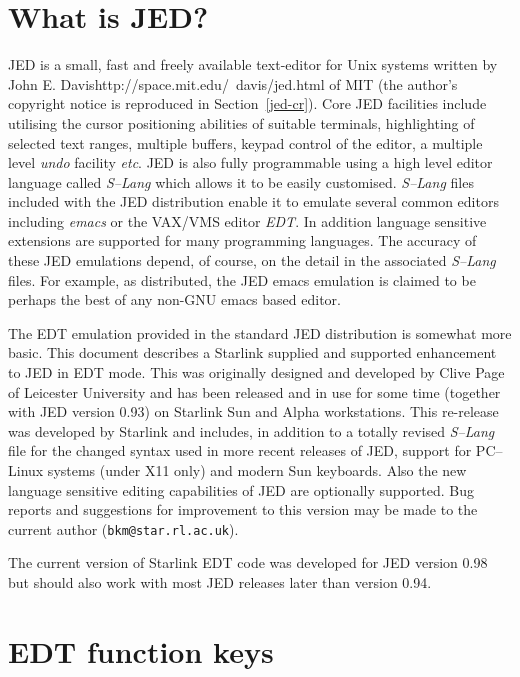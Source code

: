 \documentclass[twoside,11pt]{starlink}
\begin{document}
\scfrontmatter

\section{What is JED?}
\label{what_is_jed}

JED is a small, fast and freely available text-editor for Unix systems
written by \htmladdnormallink
{John E. Davis}{http://space.mit.edu/~davis/jed.html} of MIT (the author's
copyright notice is reproduced in Section~{\ref{jed-cr}}). Core JED
facilities include utilising the cursor positioning abilities of suitable
terminals, highlighting of selected text ranges, multiple buffers, keypad
control of the editor, a multiple level \textit{undo} facility
\textit{etc}. JED is also fully programmable using a high level editor
language called \textit{S--Lang} which allows it to be easily customised.
\textit{S--Lang} files included with the JED distribution enable it to
emulate several common editors including \textit{emacs} or the VAX/VMS
editor \textit{EDT}.  In addition language sensitive extensions are
supported for many programming languages. The accuracy of these JED
emulations depend, of course, on the detail in the associated
\textit{S--Lang} files. For example, as distributed, the JED emacs
emulation is claimed to be perhaps the best of any non-GNU emacs based
editor.

The EDT emulation provided in the standard JED distribution is
somewhat more basic. This document describes a Starlink supplied and
supported enhancement to JED in EDT mode. This was originally designed
and developed by Clive Page of Leicester University and has been
released and in use for some time (together with JED version 0.93) on
Starlink Sun and Alpha workstations. This re-release was developed by
Starlink and includes, in addition to a totally revised \textit{S--Lang}
file for the changed syntax used in more recent releases of
JED, support for PC--Linux systems (under X11 only) and modern Sun
keyboards. Also the new language sensitive editing capabilities
of JED are optionally supported. Bug reports and suggestions for improvement
to this version may be made to the current author (\texttt{bkm@star.rl.ac.uk}).

The current version of Starlink EDT code was developed for JED version 0.98
but should also work with most JED releases later than version 0.94.

\section{EDT function keys}
\label{edt_function_keys}
\end{document}
